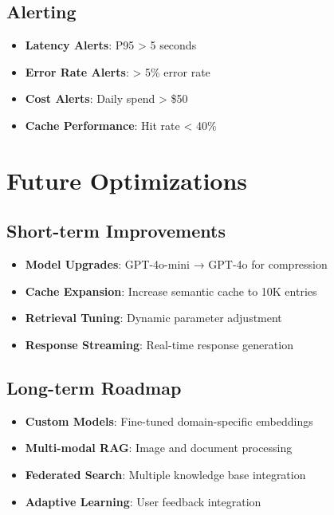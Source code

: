 \documentclass[11pt,a4paper]{article}
\begin{document}
\subsection{Alerting}

\begin{itemize}
    \item \textbf{Latency Alerts}: P95 > 5 seconds
    \item \textbf{Error Rate Alerts}: > 5\% error rate
    \item \textbf{Cost Alerts}: Daily spend > \$50
    \item \textbf{Cache Performance}: Hit rate < 40\%
\end{itemize}

\section{Future Optimizations}

\subsection{Short-term Improvements}

\begin{itemize}
    \item \textbf{Model Upgrades}: GPT-4o-mini → GPT-4o for compression
    \item \textbf{Cache Expansion}: Increase semantic cache to 10K entries
    \item \textbf{Retrieval Tuning}: Dynamic parameter adjustment
    \item \textbf{Response Streaming}: Real-time response generation
\end{itemize}

\subsection{Long-term Roadmap}

\begin{itemize}
    \item \textbf{Custom Models}: Fine-tuned domain-specific embeddings
    \item \textbf{Multi-modal RAG}: Image and document processing
    \item \textbf{Federated Search}: Multiple knowledge base integration
    \item \textbf{Adaptive Learning}: User feedback integration
\end{itemize}
\end{document}
